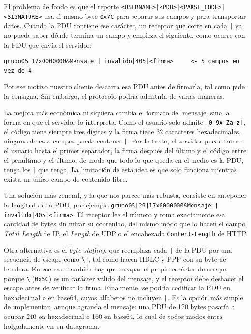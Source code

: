 \documentclass[11pt,a4paper]{article}
\newcommand{\pipe}{\texttt{|}}
\newcommand{\code}[1]{\texttt{#1}}
\begin{document}
El problema de fondo es que el reporte \code{<USERNAME>|<PDU>|<PARSE\_CODE>|<SIGNATURE>} usa el mismo byte \code{0x7C} para separar sus campos y para transportar datos. Cuando la PDU contiene ese carácter, un receptor que corte en cada \pipe{} ya no puede saber dónde termina un campo y empieza el siguiente, como ocurre con la PDU que envía el servidor:

\begin{lstlisting}
grupo05|17x0000000&Mensaje | invalido|405|<firma>     <- 5 campos en vez de 4
\end{lstlisting}

Por ese motivo nuestro cliente descarta esa PDU antes de firmarla, tal como pide la consigna. Sin embargo, el protocolo podría admitirla de varias maneras.

La mejora más económica ni siquiera cambia el formato del mensaje, sino la forma en que el servidor lo interpreta. Como el usuario solo admite \code{[0-9A-Za-z]}, el código tiene siempre tres dígitos y la firma tiene 32 caracteres hexadecimales, ninguno de esos campos puede contener \pipe{}. Por lo tanto, el servidor puede tomar el usuario hasta el primer separador, la firma después del último y el código entre el penúltimo y el último, de modo que todo lo que queda en el medio es la PDU, tenga los \pipe{} que tenga. La limitación de esta idea es que solo funciona mientras exista un único campo de contenido libre.

Una solución más general, y la que nos parece más robusta, consiste en anteponer la longitud de la PDU, por ejemplo \code{grupo05|29|17x0000000\&Mensaje | invalido|405|<firma>}. El receptor lee el número y toma exactamente esa cantidad de bytes sin mirar su contenido, del mismo modo que lo hacen el campo \emph{Total Length} de IP, el \emph{Length} de UDP o el encabezado \code{Content-Length} de HTTP.

Otra alternativa es el \emph{byte stuffing}, que reemplaza cada \pipe{} de la PDU por una secuencia de escape como \code{\textbackslash|}, tal como hacen HDLC y PPP con su byte de bandera. En ese caso también hay que escapar el propio carácter de escape, porque \code{\textbackslash} (\code{0x5C}) es un carácter válido del mensaje, y el receptor debe deshacer el escape antes de verificar la firma. Finalmente, se podría codificar la PDU en hexadecimal o en base64, cuyos alfabetos no incluyen \pipe{}. Es la opción más simple de implementar, aunque agranda el mensaje: una PDU de 120 bytes pasaría a ocupar 240 en hexadecimal o 160 en base64, lo cual de todos modos entra holgadamente en un datagrama.
\end{document}
